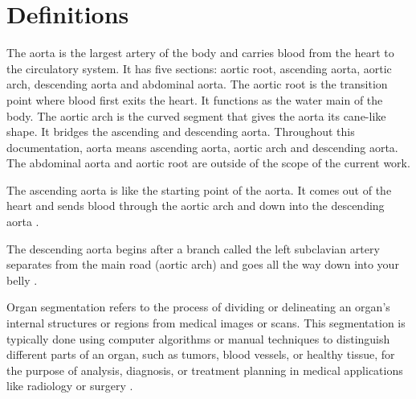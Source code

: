 

\section*{Definitions}
\begin{description}[font=\rmfamily\bfseries, leftmargin=3cm, style=nextline]
	\item[Aorta] The aorta is the largest artery of the body and carries blood from the heart to the circulatory system. It has five sections: aortic root, ascending aorta, aortic arch, descending aorta and abdominal aorta. The aortic root is the transition point where blood first exits the heart. It functions as the water main of the body. The aortic arch is the curved segment that gives the aorta its cane-like shape. It bridges the ascending and descending aorta. Throughout this documentation, aorta means ascending aorta, aortic arch and descending aorta. The abdominal aorta and aortic root are outside of the scope of the current work.
	\item[Ascending Aorta] The ascending aorta is like the starting point of the aorta. It comes out of the heart and sends blood through the aortic arch and down into the descending aorta \cite{professional_asc_2023}.
	\item[Descending Aorta] The descending aorta begins after a branch called the left subclavian artery separates from the main road (aortic arch) and goes all the way down into your belly \cite{professiona_des_2023}.
	\item[Organ Segmentation] Organ segmentation refers to the process of dividing or delineating an organ's internal structures or regions from medical images or scans. This segmentation is typically done using computer algorithms or manual techniques to distinguish different parts of an organ, such as tumors, blood vessels, or healthy tissue, for the purpose of analysis, diagnosis, or treatment planning in medical applications like radiology or surgery \cite{EMINAGA2021309}.

\end{description}
